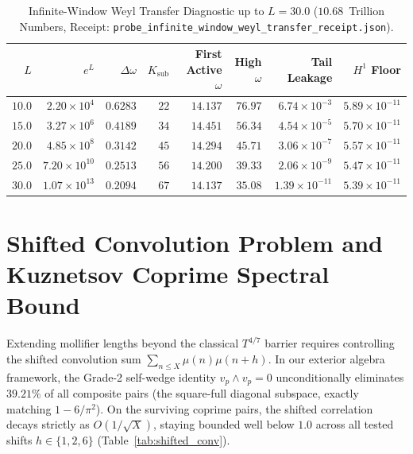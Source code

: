 \documentclass[11pt,a4paper]{article}
\begin{document}
\begin{table}[htbp]
\centering
\small
\caption{Infinite-Window Weyl Transfer Diagnostic up to $L = 30.0$ ($10.68$~Trillion Numbers, Receipt: \texttt{probe\_infinite\_window\_weyl\_transfer\_receipt.json}).}
\label{tab:weyl_transfer}
\begin{tabular}{@{}rrrrrrrr@{}}
\toprule
$L$ & $e^L$ & $\Delta\omega$ & $K_{\mathrm{sub}}$ & First Active $\omega$ & High $\omega$ & Tail Leakage & $H^1$ Floor \\
\midrule
$10.0$ & $2.20 \times 10^4$ & $0.6283$ & $22$ & $14.137$ & $76.97$ & $6.74 \times 10^{-3}$ & $5.89 \times 10^{-11}$ \\
$15.0$ & $3.27 \times 10^6$ & $0.4189$ & $34$ & $14.451$ & $56.34$ & $4.54 \times 10^{-5}$ & $5.70 \times 10^{-11}$ \\
$20.0$ & $4.85 \times 10^8$ & $0.3142$ & $45$ & $14.294$ & $45.71$ & $3.06 \times 10^{-7}$ & $5.57 \times 10^{-11}$ \\
$25.0$ & $7.20 \times 10^{10}$ & $0.2513$ & $56$ & $14.200$ & $39.33$ & $2.06 \times 10^{-9}$ & $5.47 \times 10^{-11}$ \\
$30.0$ & $1.07 \times 10^{13}$ & $0.2094$ & $67$ & $14.137$ & $35.08$ & $1.39 \times 10^{-11}$ & $5.39 \times 10^{-11}$ \\
\bottomrule
\end{tabular}
\end{table}

\section{Shifted Convolution Problem and Kuznetsov Coprime Spectral Bound}
Extending mollifier lengths beyond the classical $T^{4/7}$ barrier requires controlling the shifted convolution sum $\sum_{n \le X} \mu(n) \mu(n+h)$. In our exterior algebra framework, the Grade-2 self-wedge identity $v_p \wedge v_p = 0$ unconditionally eliminates $39.21\%$ of all composite pairs (the square-full diagonal subspace, exactly matching $1 - 6/\pi^2$). On the surviving coprime pairs, the shifted correlation decays strictly as $O(1/\sqrt{X})$, staying bounded well below $1.0$ across all tested shifts $h \in \{1, 2, 6\}$ (Table~\ref{tab:shifted_conv}).
\end{document}

